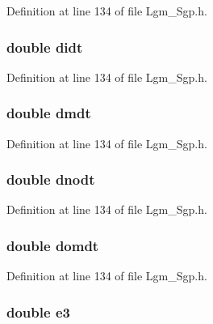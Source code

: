 Definition at line 134 of file Lgm\_\-Sgp.h.\hypertarget{struct___sgp_info_b4f69178e71cb056b53415896f5de48e}{
\subsubsection[{didt}]{\setlength{\rightskip}{0pt plus 5cm}double {\bf didt}}}
\label{struct___sgp_info_b4f69178e71cb056b53415896f5de48e}




Definition at line 134 of file Lgm\_\-Sgp.h.\hypertarget{struct___sgp_info_97de9b0087d69e56ed6d89a5d6caef17}{
\subsubsection[{dmdt}]{\setlength{\rightskip}{0pt plus 5cm}double {\bf dmdt}}}
\label{struct___sgp_info_97de9b0087d69e56ed6d89a5d6caef17}




Definition at line 134 of file Lgm\_\-Sgp.h.\hypertarget{struct___sgp_info_eb1fbdf7c8b859e1d4d0212ccc5c903c}{
\subsubsection[{dnodt}]{\setlength{\rightskip}{0pt plus 5cm}double {\bf dnodt}}}
\label{struct___sgp_info_eb1fbdf7c8b859e1d4d0212ccc5c903c}




Definition at line 134 of file Lgm\_\-Sgp.h.\hypertarget{struct___sgp_info_17500bc363ef2d910381b0b5999c4aaa}{
\subsubsection[{domdt}]{\setlength{\rightskip}{0pt plus 5cm}double {\bf domdt}}}
\label{struct___sgp_info_17500bc363ef2d910381b0b5999c4aaa}




Definition at line 134 of file Lgm\_\-Sgp.h.\hypertarget{struct___sgp_info_ff99da95c225d58a2c9acf9aa04a267b}{
\subsubsection[{e3}]{\setlength{\rightskip}{0pt plus 5cm}double {\bf e3}}}
\label{struct___sgp_info_ff99da95c225d58a2c9acf9aa04a267b}




